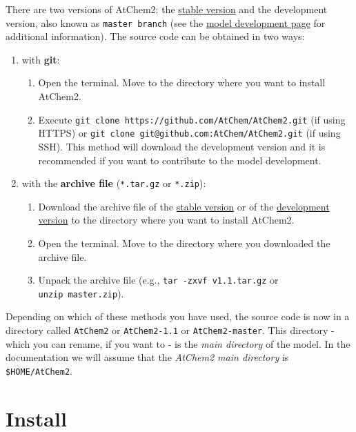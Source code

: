 There are two versions of AtChem2: the
\href{https://github.com/AtChem/AtChem2/releases}{stable version} and
the development version, also known as \texttt{master\ branch} (see
the \hyperref[ch:development]{model development page} for additional
information). The source code can be obtained in two ways:

\begin{enumerate}
\item with \textbf{git}:
  \begin{enumerate}
  \item Open the terminal. Move to the directory where you want to
    install AtChem2.
  \item Execute \texttt{git\ clone\
      https://github.com/AtChem/AtChem2.git} (if using HTTPS) or
    \texttt{git\ clone\ git@github.com:AtChem/AtChem2.git} (if using
    SSH). This method will download the development version and it is
    recommended if you want to contribute to the model development.
  \end{enumerate}

\item with the \textbf{archive file} (\texttt{*.tar.gz} or
  \texttt{*.zip}):
  \begin{enumerate}
  \item Download the archive file of the
    \href{https://github.com/AtChem/AtChem2/releases}{stable version}
    or of the
    \href{https://github.com/AtChem/AtChem2/archive/master.zip}{development
      version} to the directory where you want to install AtChem2.
  \item Open the terminal. Move to the directory where you downloaded
    the archive file.
  \item Unpack the archive file (e.g., \texttt{tar\ -zxvf\
      v1.1.tar.gz} or \texttt{unzip\ master.zip}).
  \end{enumerate}
\end{enumerate}

Depending on which of these methods you have used, the source code is
now in a directory called \texttt{AtChem2} or \texttt{AtChem2-1.1} or
\texttt{AtChem2-master}. This directory - which you can rename, if you
want to - is the \emph{main directory} of the model. In the
documentation we will assume that the \emph{AtChem2 main directory} is
\texttt{\$HOME/AtChem2}.

\section{Install} \label{sec:install}

